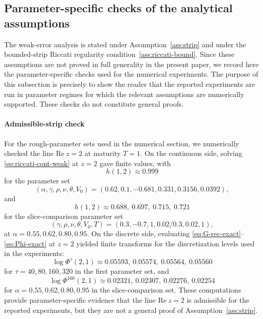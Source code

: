 \documentclass[letterpaper]{article}
\numberwithin{equation}{section}
\theoremstyle{definition}
\theoremstyle{remark}
\begin{document}
\subsection{Parameter-specific checks of the analytical assumptions}
\label{subsec:numerical-assumption-checks}

The weak-error analysis is stated under Assumption~\ref{ass:strip} and under
the bounded-strip Riccati regularity condition~\ref{ass:riccati-bound}. Since
these assumptions are not proved in full
generality in the present paper, we record here the parameter-specific checks
used for the numerical experiments. The purpose of this subsection is precisely
to show the reader that the reported experiments are run in parameter regimes
for which the relevant assumptions are numerically supported. These checks do
not constitute general proofs.

\paragraph{Admissible-strip check}
For the rough-parameter sets used in the numerical section, we numerically
checked the line $\mathrm{Re}\ z=2$ at maturity $T=1$. On the continuous side, solving
\eqref{eq:riccati-cont-weak} at $z=2$ gave finite values, with
\[
  h(1,2)\approx 0.999
\]
for the parameter set
\[
  (\alpha,\gamma,\rho,\nu,\theta,V_0)=(0.62,0.1,-0.681,0.331,0.3156,0.0392),
\]
and
\[
  h(1,2)\approx 0.688,\ 0.697,\ 0.715,\ 0.721
\]
for the slice-comparison parameter set
\[
  (\gamma,\rho,\nu,\theta,V_0,T)=(0.3,-0.7,1,0.02/0.3,0.02,1),
\]
at $\alpha=0.55,0.62,0.80,0.95$. On the discrete side, evaluating
\eqref{eq:G-rec-exact}--\eqref{eq:Phi-exact} at $z=2$ yielded finite transforms
for the discretization levels used in the experiments:
\[
  \log \Phi^\tau(2,1)\approx 0.05593,\ 0.05574,\ 0.05564,\ 0.05560
\]
for $\tau=40,80,160,320$ in the first parameter set, and
\[
  \log \Phi^{160}(2,1)\approx 0.02321,\ 0.02307,\ 0.02276,\ 0.02254
\]
for $\alpha=0.55,0.62,0.80,0.95$ in the slice-comparison set. These
computations provide parameter-specific evidence that the line $\mathrm{Re}\ z=2$ is
admissible for the reported experiments, but they are not a general proof of
Assumption~\ref{ass:strip}.
\end{document}
